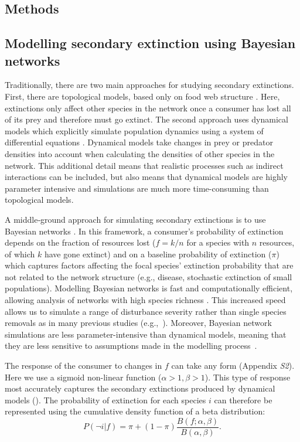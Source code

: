 \documentclass[12pt]{article}
\begin{document}
\begin{spacing}{2.0}
\section*{Methods}

    \subsection*{Modelling secondary extinction using Bayesian networks}

        Traditionally, there are two main approaches for studying secondary extinctions. First, there are topological models, based only on food web structure \citep{dunne2009cascading}. Here, extinctions only affect other species in the network once a consumer has lost all of its prey and therefore must go extinct. 
        The second approach uses dynamical models which explicitly simulate population dynamics using a system of differential equations \citep{binzer2011susceptibility}. Dynamical models take changes in prey or predator densities into account when calculating the densities of other species in the network. 
        This additional detail means that realistic processes such as indirect interactions can be included, but also means that dynamical models are highly parameter intensive and simulations are much more time-consuming than topological models. 
        
        
        A middle‐ground approach for simulating secondary extinctions is to use Bayesian networks \citep{Eklof2013,Haussler2020}. 
        In this framework, a consumer's probability of extinction depends on the fraction of resources lost ($f = k/n$ for a species with $n$ resources, of which $k$ have gone extinct) and on a baseline probability of extinction ($\pi$) which captures factors affecting the focal species' extinction probability that are not related to the network structure (e.g., disease, stochastic extinction of small populations).
        Modelling Bayesian networks is fast and computationally efficient, allowing analysis of networks with high species richness \citep{Haussler2020}. 
        This increased speed allows us to simulate a range of disturbance severity rather than single species removals as in many previous studies (e.g.,~\citealp[]{Memmott2004,Staniczenko2010,Dunne2004}).
        Moreover, Bayesian network simulations are less parameter-intensive than dynamical models, meaning that they are less sensitive to assumptions made in the modelling process~\citep{Eklof2013}.
    
        
        The response of the consumer to changes in $f$ can take any form (Appendix \emph{S2}). Here we use a sigmoid non-linear function ($\alpha > 1, \beta > 1$).
		This type of response most accurately captures the secondary extinctions produced by dynamical models (\citealp[]{Eklof2013}).
		The probability of extinction for each species $i$ can therefore be represented using the cumulative density function of a beta distribution:
		\begin{equation}
		P(\lnot i|f) = \pi + (1 - \pi) \frac{B(f;\alpha,\beta)}{B(\alpha,\beta)}.
				\label{betafunc}
        \end{equation}
		

\end{spacing}
\end{document}

